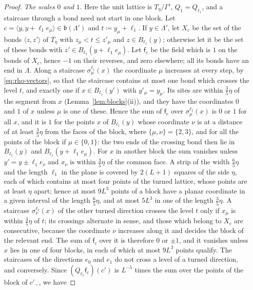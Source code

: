 \documentclass[11pt]{preprint}
\numberwithin{equation}{section}
\theoremstyle{definition}
\theoremstyle{remark}
\theoremstyle{plain}
\begin{document}
\begin{proof}
\emph{The scales $0$ and $1$.} Here the unit lattice is $T_\eta/\Gamma'$, $Q_1 = Q_{\ell_1}$, and a staircase through a bond need not start in one block. Let $c = \langle y, y + \ell_1e_\mu\rangle \in \mathfrak b(\Lambda')$ and $t \coloneqq y_\mu + \ell_1$. If $y \in \Lambda'$, let $X_c$ be the set of the bonds $\langle z, z'\rangle$ of $T_\eta$ with $z_\mu < t \leq z'_\mu$ and $z \in B_{\ell_1}(y)$; otherwise let it be the set of these bonds with $z' \in B_{\ell_1}(y + \ell_1e_\mu)$. Let $\mathsf f_c$ be the field which is $1$ on the bonds of $X_c$, hence $-1$ on their reverses, and zero elsewhere; all its bonds have an end in $\Lambda$. Along a staircase $\sigma^{\ell_1}_\mu(x)$ the coordinate $\mu$ increases at every step, by \eqref{eq:rho-vectors}, so that the staircase contains at most one bond which crosses the level $t$, and exactly one if $x \in B_{\ell_1}(y')$ with $y'_\mu = y_\mu$. Its sites are within $\frac35\eta$ of the segment from $x$ (Lemma~\ref{lem:blocks}(ii)), and they have the coordinates $0$ and $1$ of $x$ unless $\mu$ is one of these. Hence the sum of $\mathsf f_c$ over $\sigma^{\ell_1}_\mu(x)$ is $0$ or $1$ for all $x$, and it is $1$ for the points $x$ of $B_{\ell_1}(y)$ whose coordinate $\nu$ is at a distance of at least $\frac35\eta$ from the faces of the block, where $\{ \mu, \nu \} = \{ 2, 3 \}$, and for all the points of the block if $\mu \in \{ 0, 1 \}$: the two ends of the crossing bond then lie in $B_{\ell_1}(y)$ and $B_{\ell_1}(y + \ell_1e_\mu)$. For $x$ in another block the sum vanishes unless $y' = y \pm \ell_1e_\nu$ and $x_\nu$ is within $\frac35\eta$ of the common face. A strip of the width $\frac65\eta$ and the length $\ell_1$ in the plane is covered by $2(L + 1)$ squares of the side $\eta$, each of which contains at most four points of the turned lattice, whose points are at least $\eta$ apart; hence at most $9L^3$ points of a block have a planar coordinate in a given interval of the length $\frac65\eta$, and at most $5L^3$ in one of the length $\frac35\eta$. A staircase $\sigma^{\ell_1}_\nu(x)$ of the other turned direction crosses the level $t$ only if $x_\mu$ is within $\frac35\eta$ of $t$; its crossings alternate in sense, and those which belong to $X_c$ are consecutive, because the coordinate $\nu$ increases along it and decides the block of the relevant end. The sum of $\mathsf f_c$ over it is therefore $0$ or $\pm1$, and it vanishes unless $x$ lies in one of four blocks, in each of which at most $9L^3$ points qualify. The staircases of the directions $e_0$ and $e_1$ do not cross a level of a turned direction, and conversely. Since $(Q_{\ell_1}\mathsf f_c)(c')$ is $L^{-5}$ times the sum over the points of the block of $c'_-$, we have

\end{proof}
\end{document}
